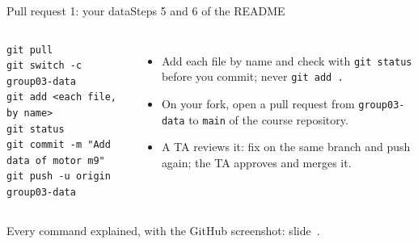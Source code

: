 %
\begin{frame}[fragile]{Pull request 1: your data}{Steps 5 and 6 of the README}
  \footnotesize
  \begin{columns}[T]
\begin{verbatim}
git pull
git switch -c group03-data
git add <each file, by name>
git status
git commit -m "Add data of motor m9"
git push -u origin group03-data
\end{verbatim}
    \begin{itemize}\setlength{\itemsep}{5pt}
      \item Add each file \alert{by name} and check with \texttt{git status} before you commit; never \texttt{git add .}
      \item On your fork, open a \alert{pull request} from \texttt{group03-data} to \texttt{main} of the course repository.
      \item A TA reviews it: fix on the same branch and push again; the TA approves and merges it.
    \end{itemize}
  \end{columns}

  \vfill
  {\scriptsize Every command explained, with the GitHub screenshot: slide~\pageref{app:git-data}.}
\end{frame}
